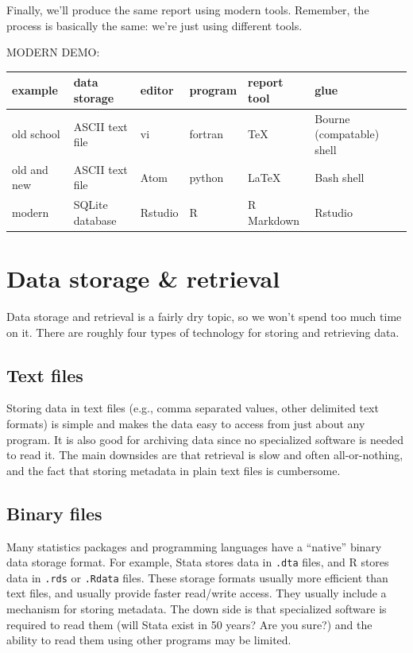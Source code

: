 \documentclass[
]{book}
\begin{document}
Finally, we'll produce the same report using modern tools. Remember, the process is basically the same: we're just using different tools.

MODERN DEMO:

\begin{longtable}[]{@{}llllll@{}}
\toprule
example & data storage & editor & program & report tool & glue\tabularnewline
\midrule
\endhead
old school & ASCII text file & vi & fortran & TeX & Bourne (compatable) shell\tabularnewline
old and new & ASCII text file & Atom & python & LaTeX & Bash shell\tabularnewline
modern & SQLite database & Rstudio & R & R Markdown & Rstudio\tabularnewline
\bottomrule
\end{longtable}

\hypertarget{data-storage-retrieval}{%
\section{Data storage \& retrieval}\label{data-storage-retrieval}}

Data storage and retrieval is a fairly dry topic, so we won't spend too much time on it. There are roughly four types of technology for storing and retrieving data.

\hypertarget{text-files}{%
\subsection{Text files}\label{text-files}}

Storing data in text files (e.g., comma separated values, other delimited text formats) is simple and makes the data easy to access from just about any program. It is also good for archiving data since no specialized software is needed to read it. The main downsides are that retrieval is slow and often all-or-nothing, and the fact that storing metadata in plain text files is cumbersome.

\hypertarget{binary-files}{%
\subsection{Binary files}\label{binary-files}}

Many statistics packages and programming languages have a ``native'' binary data storage format. For example, Stata stores data in \texttt{.dta} files, and R stores data in \texttt{.rds} or \texttt{.Rdata} files. These storage formats usually more efficient than text files, and usually provide faster read/write access. They usually include a mechanism for storing metadata. The down side is that specialized software is required to read them (will Stata exist in 50 years? Are you sure?) and the ability to read them using other programs may be limited.
\end{document}
